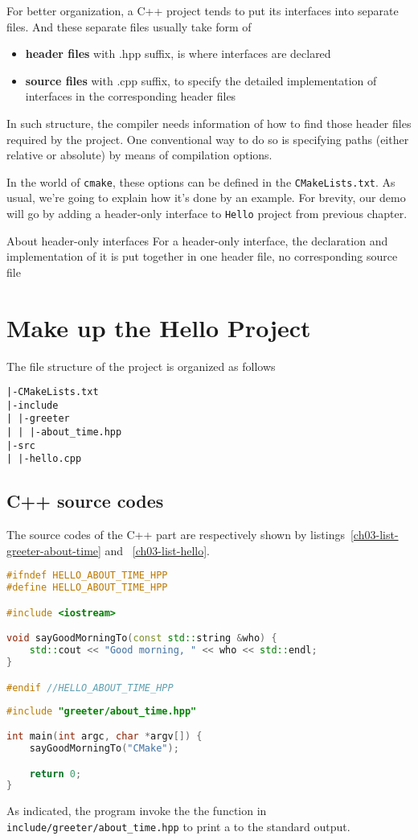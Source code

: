 For better organization, a C++ project tends to put its interfaces into separate files. And these separate files usually take form of 
\begin{itemize}
  \item \textbf{header files} with .hpp suffix, is where interfaces are declared 
  \item \textbf{source files} with .cpp suffix, to specify the detailed implementation of interfaces in the corresponding header files
\end{itemize}
In such structure, the compiler needs information of how to find those header files required by the project. One conventional way to do so is specifying paths (either relative or absolute) by means of compilation options.\par
In the world of \texttt{cmake}, these options can be defined in the \texttt{CMakeLists.txt}. As usual, we're going to explain how it's done by an example. For brevity, our demo will go by adding a header-only interface to \texttt{Hello} project from previous chapter. 
\begin{minfo}{About header-only interfaces}
  For a header-only interface, the declaration and implementation of it is put together in one header file, no corresponding source file
\end{minfo}
\section{Make up the Hello Project}
The file structure of the project is organized as follows
\begin{lstlisting}
|-CMakeLists.txt
|-include
| |-greeter
| | |-about_time.hpp
|-src
| |-hello.cpp
\end{lstlisting}
\subsection{C++ source codes}
The source codes of the C++ part are respectively shown by listings~\ref{ch03-list-greeter-about-time} and ~\ref{ch03-list-hello}. \par
\begin{lstlisting}[caption={Codes for \texttt{include/greeter/about\_time.hpp}},label=ch03-list-greeter-about-time,language=C++]
#ifndef HELLO_ABOUT_TIME_HPP
#define HELLO_ABOUT_TIME_HPP

#include <iostream>

void sayGoodMorningTo(const std::string &who) {
    std::cout << "Good morning, " << who << std::endl;
}

#endif //HELLO_ABOUT_TIME_HPP
\end{lstlisting}
\begin{lstlisting}[caption={Codes for \texttt{src/hello.cpp}},label=ch03-list-hello,language=C++]
#include "greeter/about_time.hpp"

int main(int argc, char *argv[]) {
    sayGoodMorningTo("CMake");

    return 0;
}
\end{lstlisting}
As indicated, the program invoke the the  function in \texttt{include/greeter/about\_time.hpp} to print a  to the standard output.

